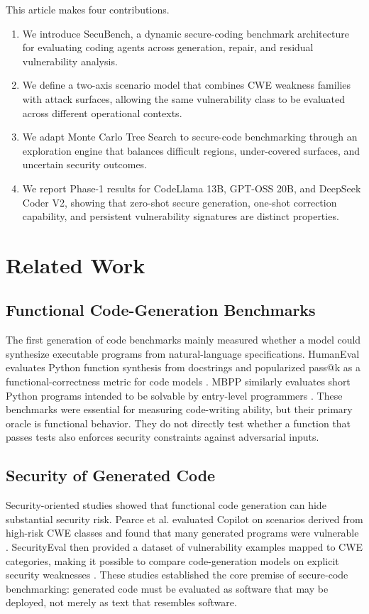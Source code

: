 \documentclass[11pt]{article}
\newcommand{\toolname}{SecuBench}
\begin{document}
This article makes four contributions.
\begin{enumerate}
\item We introduce \toolname{}, a dynamic secure-coding benchmark architecture for evaluating coding agents across generation, repair, and residual vulnerability analysis.
\item We define a two-axis scenario model that combines CWE weakness families with attack surfaces, allowing the same vulnerability class to be evaluated across different operational contexts.
\item We adapt Monte Carlo Tree Search to secure-code benchmarking through an exploration engine that balances difficult regions, under-covered surfaces, and uncertain security outcomes.
\item We report Phase-1 results for CodeLlama 13B, GPT-OSS 20B, and DeepSeek Coder V2, showing that zero-shot secure generation, one-shot correction capability, and persistent vulnerability signatures are distinct properties.
\end{enumerate}


\section{Related Work}

\subsection{Functional Code-Generation Benchmarks}

The first generation of code benchmarks mainly measured whether a model could synthesize executable programs from natural-language specifications. HumanEval evaluates Python function synthesis from docstrings and popularized pass@k as a functional-correctness metric for code models \cite{chen2021codex}. MBPP similarly evaluates short Python programs intended to be solvable by entry-level programmers \cite{austin2021programsynthesis}. These benchmarks were essential for measuring code-writing ability, but their primary oracle is functional behavior. They do not directly test whether a function that passes tests also enforces security constraints against adversarial inputs.

\subsection{Security of Generated Code}

Security-oriented studies showed that functional code generation can hide substantial security risk. Pearce et al. evaluated Copilot on scenarios derived from high-risk CWE classes and found that many generated programs were vulnerable \cite{pearce2022asleep}. SecurityEval then provided a dataset of vulnerability examples mapped to CWE categories, making it possible to compare code-generation models on explicit security weaknesses \cite{siddiq2022securityeval}. These studies established the core premise of secure-code benchmarking: generated code must be evaluated as software that may be deployed, not merely as text that resembles software.
\end{document}
